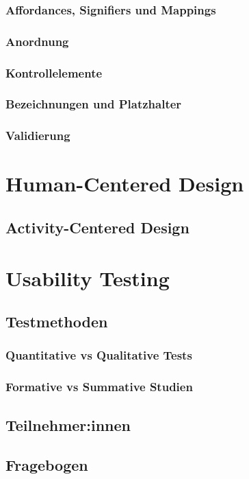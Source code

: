 \documentclass[a4paper, 12pt, oneside, BCOR=1cm,toc=chapterentrywithdots]{scrbook}
\begin{document}
\subsubsection{Affordances, Signifiers und Mappings}
\subsubsection{Anordnung}
\subsubsection{Kontrollelemente}
\subsubsection{Bezeichnungen und Platzhalter}
\subsubsection{Validierung}

\section{Human-Centered Design}
\subsection{Activity-Centered Design}

\section{Usability Testing}
\cite{barnumUsabilityTesting2021}
\subsection{Testmethoden}
\subsubsection{Quantitative vs Qualitative Tests}
\subsubsection{Formative vs Summative Studien}
\subsection{Teilnehmer:innen}
\subsection{Fragebogen}
\end{document}
